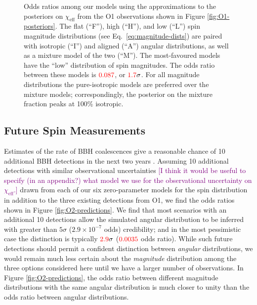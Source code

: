 \documentclass[modern,linenumbers]{aastex61}
\newcommand{\chieff}{\chi_\mathrm{eff}}
\newcommand{\checkme}[1]{\textcolor{red}{#1}}
\newcommand{\OOneSigmaIsoAligned}{\checkme{1.7}}
\newcommand{\OOneOddsIsoAligned}{\checkme{0.087}}
\newcommand{\OTwoSigmaIsoAlignedMin}{\checkme{2.9}}
\newcommand{\OTwoOddsIsoAlignedMin}{\checkme{0.0035}}
\newcommand{\ilya}[1]{\textcolor{purple}{#1}}
\begin{document}
\begin{figure}
  \caption{Odds ratios among our models using the approximations to
    the posteriors on $\chieff$ from the O1 observations shown in
    Figure \ref{fig:O1-posteriors}.  The flat (``F''), high (``H''),
    and low (``L'') spin magnitude distributions (see Eq.\
    \eqref{eq:magnitude-dists}) are paired with isotropic (``I'') and
    aligned (``A'') angular distributions, as well as a mixture model
    of the two (``$\mathrm{M}$'').  The most-favoured models have the
    ``low'' distribution of spin magnitudes.  The odds ratio between
    these models is $\OOneOddsIsoAligned$, or
    $\OOneSigmaIsoAligned\sigma$.  For all magnitude distributions the
    pure-isotropic models are preferred over the mixture models;
    correspondingly, the posterior on the mixture fraction peaks at
    100\% isotropic.}
  \label{fig:O1-odds}
\end{figure}

\subsection{Future Spin Measurements}
\label{subsec:future}

Estimates of the rate of \ac{BBH} coalescences give a reasonable
chance of 10 additional \ac{BBH} detections in the next two years
\citep{O1-BBH,2016ApJ...833L...1A,2016ApJS..227...14A}.  Assuming 10
additional detections with similar observational uncertainties
\ilya{[I think it would be useful to specify (in an appendix?) what
  model we use for the observational uncertainty on $\chieff$.]}
drawn from each of our six zero-parameter models for the spin
distribution in addition to the three existing detections from O1, we
find the odds ratios shown in Figure \ref{fig:O2-predictions}.  We
find that most scenarios with an additional 10 detections allow the
simulated angular distribution to be inferred with greater than
$5\sigma$ ($2.9 \times 10^{-7}$ odds) credibility; and in the most
pessimistic case the distinction is typically
$\OTwoSigmaIsoAlignedMin\sigma$ ($\OTwoOddsIsoAlignedMin$ odds ratio).
While such future detections should permit a confident distinction
between \emph{angular} distributions, we would remain much less
certain about the \emph{magnitude} distribution among the three
options considered here until we have a larger number of observations.
In Figure \ref{fig:O2-predictions}, the odds ratio between different
magnitude distributions with the same angular distribution is much
closer to unity than the odds ratio between angular distributions.
\end{document}
